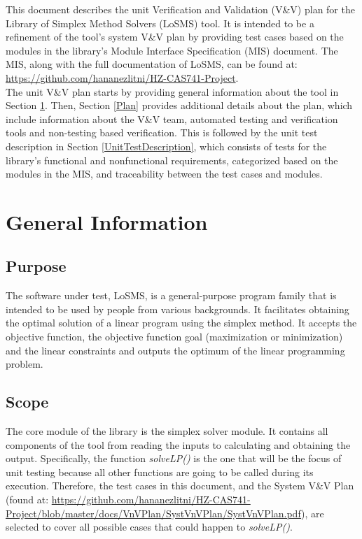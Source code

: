 \documentclass[12pt, titlepage]{article}
\newcommand{\famname}{LoSMS}
\begin{document}
\newpage


This document describes the unit Verification and Validation (V\&V) plan for
the Library of Simplex Method Solvers (\famname{}) tool. It is intended to be a 
refinement of the tool's system V\&V plan by providing test cases based on 
the modules in the library's Module Interface Specification (MIS) document. The 
MIS, along with the full documentation of \famname{}, can be found at: 
\url{https://github.com/hananezlitni/HZ-CAS741-Project}.\\

The unit V\&V plan starts by providing general information about the tool in 
Section \ref{GeneralInfo}. Then, Section \ref{Plan} provides additional details 
about the plan, which include information about the V\&V team, automated 
testing and verification tools and non-testing based verification. This is 
followed by the unit test description in Section \ref{UnitTestDescription}, 
which consists of tests for the library's functional and nonfunctional 
requirements, categorized based on the modules in the MIS, and traceability 
between the test cases and modules.

\section{General Information} \label{GeneralInfo}

\subsection{Purpose}

The software under test, \famname{}, is a general-purpose program family that 
is intended to be used by people from various backgrounds. It facilitates 
obtaining the optimal solution of a linear program using the simplex method. It 
accepts the objective function, the objective function goal (maximization or 
minimization) and the linear constraints and outputs the optimum of the linear 
programming problem.

\subsection{Scope} \label{Scope}

The core module of the library is the simplex solver module. It contains all 
components of the tool from reading the inputs to calculating and obtaining the 
output. Specifically, the function \textit{solveLP()} is the one that will be 
the focus of unit testing because all other functions are going to be called 
during its execution. Therefore, the test cases in this document, and the 
System V\&V Plan (found at: 
\url{https://github.com/hananezlitni/HZ-CAS741-Project/blob/master/docs/VnVPlan/SystVnVPlan/SystVnVPlan.pdf}),
 are selected to cover all possible cases that could happen to 
\textit{solveLP()}. \\
\end{document}
